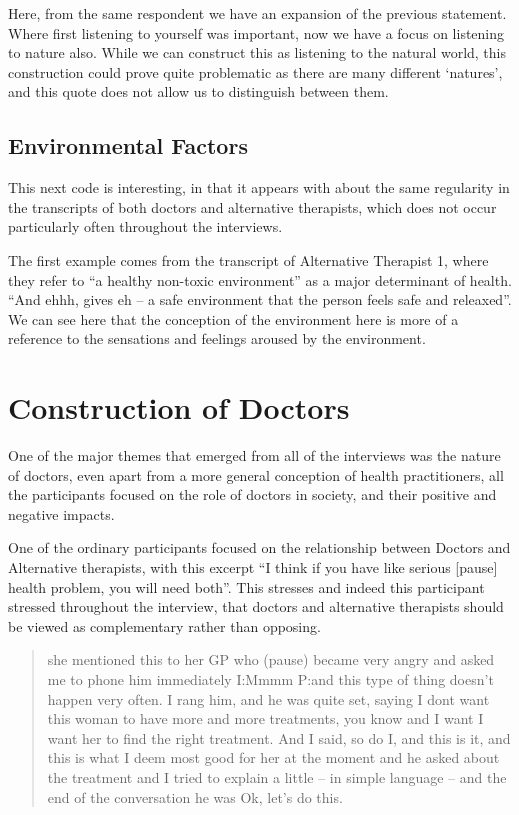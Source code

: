 Here, from the same respondent we have an expansion of the previous statement. Where first listening to yourself was important, now we have a focus on listening to nature also. While we can construct this as listening to the natural world, this construction could prove quite problematic as there are many different `natures', and this quote does not allow us to distinguish between them. 

\subsection{Environmental Factors}

This next code is interesting, in that it appears  with about the same regularity in the transcripts of both doctors and alternative therapists, which does not occur particularly often throughout the interviews. 

The first example comes from the transcript of Alternative Therapist 1, where they refer to ``a healthy non-toxic environment'' as a major determinant of health. ``And ehhh, gives eh – a safe environment that the person feels safe and releaxed''. We can see here that the conception of the environment here is more of a reference to the sensations and feelings aroused by the environment. 

\section{Construction of Doctors}
\label{sec:construction-doctors}

One of the major themes that emerged from all of the interviews was the nature of doctors, even apart from a more general conception of health practitioners, all the participants focused on the role of doctors in society, and their positive and negative impacts. 

One of the ordinary participants focused on the relationship between Doctors and Alternative therapists, with this excerpt ``I think if you have like serious [pause] health problem, you will need both''. This stresses and indeed this participant stressed throughout the interview, that doctors and alternative therapists should be viewed as complementary rather than opposing. 

\begin{quotation}
  she mentioned this to her GP who (pause) became very angry and asked me to phone him immediately 
I:Mmmm
P:and this type of thing doesn't happen very often. I rang him, and he was quite set, saying I dont want this woman to have more and more treatments, you know and I want I want her to find the right treatment. And I said, so do I, and this is it, and this is what I deem most good for her at the moment and he asked about the treatment and I tried to explain a little – in simple language – and the end of the conversation he was Ok, let's do this. 

\end{quotation}

